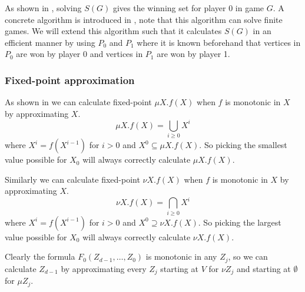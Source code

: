 As shown in \cite{WALUKIEWICZ2002311}, solving $S(G)$ gives the winning set for player $0$ in game $G$. A concrete algorithm is introduced in \cite{FPITE}, note that this algorithm can solve finite games. We will extend this algorithm such that it calculates $S(G)$ in an efficient manner by using $P_0$ and $P_1$ where it is known beforehand that vertices in $P_0$ are won by player 0 and vertices in $P_1$ are won by player 1. 

\subsubsection{Fixed-point approximation}
As shown in \cite{Emerson:1986:MCP:900378} we can calculate fixed-point $\mu X.f(X)$ when $f$ is monotonic in $X$ by approximating $X$.
\[ \mu X.f(X) = \bigcup_{i \geq 0} X^i \]
where $X^i = f(X^{i-1})$ for $i > 0$ and $X^0 \subseteq \mu X.f(X)$. So picking the smallest value possible for $X_0$ will always correctly calculate $\mu X. f(X)$.

Similarly we can calculate fixed-point $\nu X.f(X)$ when $f$ is monotonic in $X$ by approximating $X$.
\[ \nu X.f(X) = \bigcap_{i \geq 0} X^i \]
where $X^i = f(X^{i-1})$ for $i > 0$ and $X^0 \supseteq \nu X.f(X)$. So picking the largest value possible for $X_0$ will always correctly calculate $\nu X. f(X)$.

Clearly the formula $F_0(Z_{d-1},\dots,Z_0)$ is monotonic in any $Z_j$, so we can calculate $Z_{d-1}$ by approximating every $Z_j$ starting at $V$ for $\nu Z_j$ and starting at $\emptyset$ for $\mu Z_j$.

